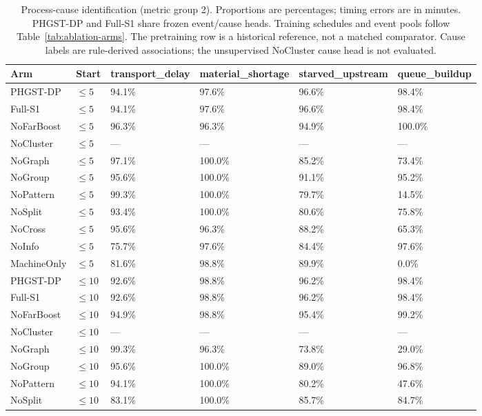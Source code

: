 \begin{table}[p]
\centering
\scriptsize
\setlength{\tabcolsep}{3pt}
\renewcommand{\arraystretch}{1.12}
\caption{Process-cause identification (metric group 2). Proportions are percentages; timing errors are in minutes. PHGST-DP and Full-S1 share frozen event/cause heads. Training schedules and event pools follow Table~\ref{tab:ablation-arms}. The pretraining row is a historical reference, not a matched comparator. Cause labels are rule-derived associations; the unsupervised NoCluster cause head is not evaluated.}
\label{tab:complete-4-2}
\begin{tabularx}{\textwidth}{@{}lXXXXX@{}}
\toprule
Arm & Start & transport\_delay & material\_shortage & starved\_upstream & queue\_buildup \\
\midrule
PHGST-DP & $\le 5$ & 94.1\% & 97.6\% & 96.6\% & 98.4\% \\
Full-S1 & $\le 5$ & 94.1\% & 97.6\% & 96.6\% & 98.4\% \\
NoFarBoost & $\le 5$ & 96.3\% & 96.3\% & 94.9\% & 100.0\% \\
NoCluster & $\le 5$ & --- & --- & --- & --- \\
NoGraph & $\le 5$ & 97.1\% & 100.0\% & 85.2\% & 73.4\% \\
NoGroup & $\le 5$ & 95.6\% & 100.0\% & 91.1\% & 95.2\% \\
NoPattern & $\le 5$ & 99.3\% & 100.0\% & 79.7\% & 14.5\% \\
NoSplit & $\le 5$ & 93.4\% & 100.0\% & 80.6\% & 75.8\% \\
NoCross & $\le 5$ & 95.6\% & 96.3\% & 88.2\% & 65.3\% \\
NoInfo & $\le 5$ & 75.7\% & 97.6\% & 84.4\% & 97.6\% \\
MachineOnly & $\le 5$ & 81.6\% & 98.8\% & 89.9\% & 0.0\% \\
\midrule
PHGST-DP & $\le 10$ & 92.6\% & 98.8\% & 96.2\% & 98.4\% \\
Full-S1 & $\le 10$ & 92.6\% & 98.8\% & 96.2\% & 98.4\% \\
NoFarBoost & $\le 10$ & 94.9\% & 98.8\% & 95.4\% & 99.2\% \\
NoCluster & $\le 10$ & --- & --- & --- & --- \\
NoGraph & $\le 10$ & 99.3\% & 96.3\% & 73.8\% & 29.0\% \\
NoGroup & $\le 10$ & 95.6\% & 100.0\% & 89.0\% & 96.8\% \\
NoPattern & $\le 10$ & 94.1\% & 100.0\% & 80.2\% & 47.6\% \\
NoSplit & $\le 10$ & 83.1\% & 100.0\% & 85.7\% & 84.7\% \\

\end{tabularx}
\end{table}
